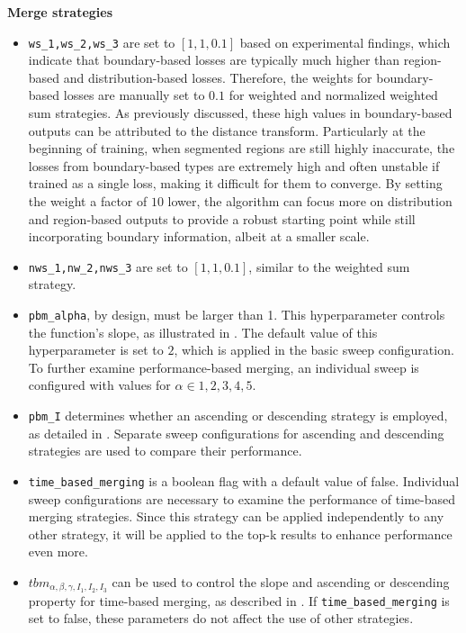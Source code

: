 \textbf{Merge strategies}
\begin{itemize}
  \item \texttt{ws\_1,ws\_2,ws\_3} are set to $[1,1,0.1]$ based on experimental findings, which indicate that boundary-based losses are typically much higher than region-based and distribution-based losses. Therefore, the weights for boundary-based losses are manually set to $0.1$ for weighted and normalized weighted sum strategies. As previously discussed, these high values in boundary-based outputs can be attributed to the distance transform. Particularly at the beginning of training, when segmented regions are still highly inaccurate, the losses from boundary-based types are extremely high and often unstable if trained as a single loss, making it difficult for them to converge. By setting the weight a factor of $10$ lower, the algorithm can focus more on distribution and region-based outputs to provide a robust starting point while still incorporating boundary information, albeit at a smaller scale.
  \item \texttt{nws\_1,nw\_2,nws\_3} are set to $[1,1,0.1]$, similar to the weighted sum strategy.
  \item \texttt{pbm\_alpha}, by design, must be larger than 1. This hyperparameter controls the function's slope, as illustrated in . The default value of this hyperparameter is set to $2$, which is applied in the basic sweep configuration. To further examine performance-based merging, an individual sweep is configured with values for $\alpha\in{1,2,3,4,5}$.
  \item \texttt{pbm\_I} determines whether an ascending or descending strategy is employed, as detailed in . Separate sweep configurations for ascending and descending strategies are used to compare their performance.
  \item \texttt{time\_based\_merging} is a boolean flag with a default value of false. Individual sweep configurations are necessary to examine the performance of time-based merging strategies. Since this strategy can be applied independently to any other strategy, it will be applied to the top-k results to enhance performance even more.
  \item \texttt{$tbm_{\alpha,\beta,\gamma,I_1,I_2,I_3}$} can be used to control the slope and ascending or descending property for time-based merging, as described in . If \texttt{time\_based\_merging} is set to false, these parameters do not affect the use of other strategies.
\end{itemize}

